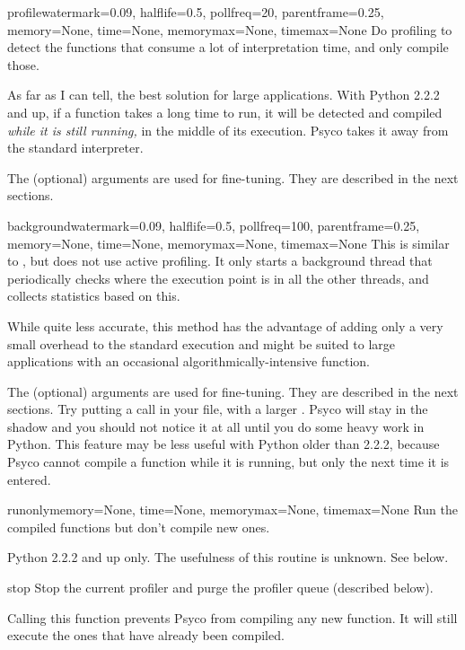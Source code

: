 \documentclass{manual}
\begin{document}
\begin{funcdesc}{profile}{watermark=0.09, halflife=0.5, pollfreq=20, parentframe=0.25, memory=None, time=None, memorymax=None, timemax=None}
  Do profiling to detect the functions that consume a lot of interpretation time, and only compile those.

  As far as I can tell, the best solution for large applications.  With Python 2.2.2 and up, if a function takes a long time to run, it will be detected and compiled \emph{while it is still running,} in the middle of its execution.  Psyco takes it away from the standard interpreter.

  The (optional) arguments are used for fine-tuning.  They are described in the next sections.
\end{funcdesc}

\begin{funcdesc}{background}{watermark=0.09, halflife=0.5, pollfreq=100, parentframe=0.25, memory=None, time=None, memorymax=None, timemax=None}
  This is similar to , but does not use active profiling.  It only starts a background thread that periodically checks where the execution point is in all the other threads, and collects statistics based on this.

  While quite less accurate, this method has the advantage of adding only a very small overhead to the standard execution and might be suited to large applications with an occasional algorithmically-intensive function.

  The (optional) arguments are used for fine-tuning.  They are described in the next sections.  Try putting a  call in your  file, with a larger .  Psyco will stay in the shadow and you should not notice it at all until you do some heavy work in Python.  This feature may be less useful with Python older than 2.2.2, because Psyco cannot compile a function while it is running, but only the next time it is entered.
\end{funcdesc}

\begin{funcdesc}{runonly}{memory=None, time=None, memorymax=None, timemax=None}
  Run the compiled functions but don't compile new ones.

  Python 2.2.2 and up only.  The usefulness of this routine is unknown.  See below.
\end{funcdesc}

\begin{funcdesc}{stop}{}
  Stop the current profiler and purge the profiler queue (described below).

  Calling this function prevents Psyco from compiling any new function.  It will still execute the ones that have already been compiled.
\end{funcdesc}
\end{document}
